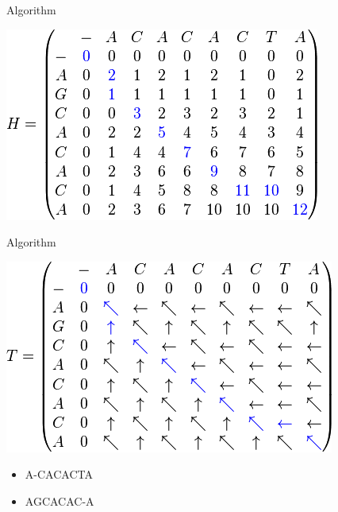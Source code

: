 \documentclass[UTF8]{beamer}
\begin{document}
\begin{frame}[t]{Algorithm}
    \centerline{\includegraphics[height=.7\textheight]{matrix.png}}
\end{frame}


\begin{frame}[t]{Algorithm}
    \centerline{\includegraphics[height=.6\textheight]{path.png}}
    \begin{itemize}
        \item A-CACACTA
        \item AGCACAC-A
    \end{itemize}
\end{frame}
\end{document}
